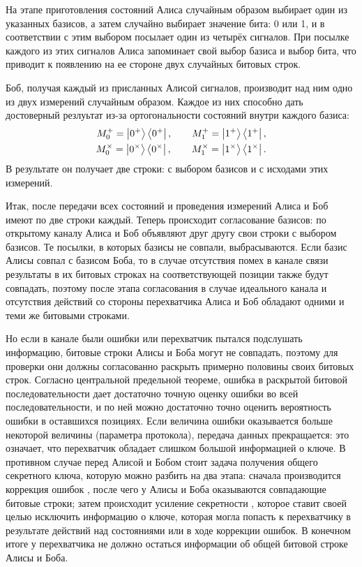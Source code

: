 На этапе приготовления состояний Алиса случайным образом выбирает один из указанных базисов, а затем случайно выбирает значение бита: 0 или 1, и в соответствии с этим выбором посылает один из четырёх сигналов. При посылке каждого из этих сигналов Алиса запоминает свой выбор базиса и выбор бита, что приводит к появлению на ее стороне двух случайных битовых строк.

Боб, получая каждый из присланных Алисой сигналов, производит над ним одно из двух измерений случайным образом. Каждое из них способно дать достоверный резлуьтат из-за ортогональности состояний внутри каждого базиса:
\begin{eqnarray}\label{bb84_bob_measurements}
  M_0^+ = \left| 0^+ \right\rangle\left\langle 0^+ \right|, \qquad M_1^+ = \left| 1^+ \right\rangle\left\langle 1^+ \right|, \nonumber\\
  M_0^\times = \left| 0^\times \right\rangle\left\langle 0^\times \right|, \qquad M_1^\times = \left| 1^\times \right\rangle\left\langle 1^\times \right|.
\end{eqnarray}
В результате он получает две строки: с выбором базисов и с исходами этих измерений.

Итак, после передачи всех состояний и проведения измерений Алиса и Боб имеют по две строки каждый. Теперь происходит согласование базисов: по открытому каналу Алиса и Боб объявляют друг другу свои строки с выбором базисов. Те посылки, в которых базисы не совпали, выбрасываются. Если базис Алисы совпал с базисом Боба, то в случае отсутствия помех в канале связи результаты в их битовых строках на соответствующей позиции также будут совпадать, поэтому после этапа согласования в случае идеального канала и отсутствия действий со стороны перехватчика Алиса и Боб обладают одними и теми же битовыми строками.

Но если в канале были ошибки или перехватчик пытался подслушать информацию, битовые строки Алисы и Боба могут не совпадать, поэтому для проверки они должны согласованно раскрыть примерно половины своих битовых строк. Согласно центральной предельной теореме, ошибка в раскрытой битовой последовательности дает достаточно точную оценку ошибки во всей последовательности, и по ней можно достаточно точно оценить вероятность ошибки в оставшихся позициях. Если величина ошибки оказывается больше некоторой величины (параметра протокола), передача данных прекращается: это означает, что перехватчик обладает слишком большой информацией о ключе. В противном случае перед Алисой и Бобом стоит задача получения общего секретного ключа, которую можно разбить на два этапа: сначала производится коррекция ошибок \cite{information_reconcilation}, после чего у Алисы и Боба оказываются совпадающие битовые строки; затем происходит усиление секретности \cite{privacy_amplification}, которое ставит своей целью исключить информацию о 
ключе, которая могла попасть к перехватчику в результате действий над состояниями или в ходе коррекции ошибок. В конечном итоге у перехватчика не должно остаться информации об общей битовой строке Алисы и Боба.

